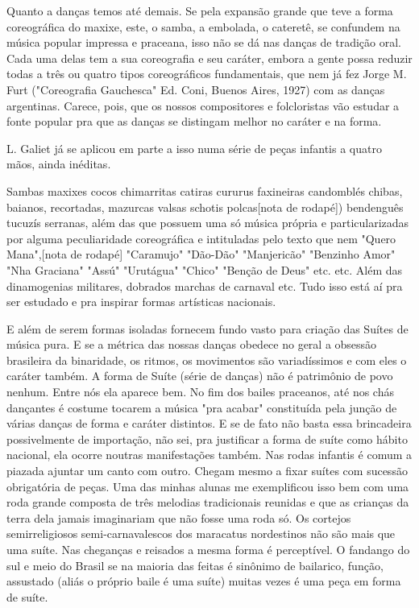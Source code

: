 Quanto a danças temos até demais. Se pela expansão grande que teve a
forma coreográfica do maxixe, este, o samba, a embolada, o cateretê, se
confundem na música popular impressa e praceana, isso não se dá nas
danças de tradição oral. Cada uma delas tem a sua coreografia e seu
caráter, embora a gente possa reduzir todas a três ou quatro tipos
coreográficos fundamentais, que nem já fez Jorge M. Furt ("Coreografia
Gauchesca" Ed. Coni, Buenos Aires, 1927) com as danças argentinas.
Carece, pois, que os nossos compositores e folcloristas vão estudar a
fonte popular pra que as danças se distingam melhor no caráter e na
forma.

L. Galiet já se aplicou em parte a isso numa série de peças infantis a
quatro mãos, ainda inéditas.

Sambas maxixes cocos chimarritas catiras cururus faxineiras candomblés
chibas, baianos, recortadas, mazurcas valsas schotis polcas{[}nota de
rodapé{]}) bendenguês tucuzís serranas, além das que possuem uma só
música própria e particularizadas por alguma peculiaridade coreográfica
e intituladas pelo texto que nem "Quero Mana",{[}nota de rodapé{]}
"Caramujo" "Dão-Dão" "Manjericão" "Benzinho Amor" "Nha Graciana" "Assú"
"Urutágua" "Chico" "Benção de Deus" etc. etc. Além das dinamogenias
militares, dobrados marchas de carnaval etc. Tudo isso está aí pra ser
estudado e pra inspirar formas artísticas nacionais.~

E além de serem formas isoladas fornecem fundo vasto para criação das
Suítes de música pura. E se a métrica das nossas danças obedece no geral
a obsessão brasileira da binaridade, os ritmos, os movimentos são
variadíssimos e com eles o caráter também. A forma de Suíte (série de
danças) não é patrimônio de povo nenhum. Entre nós ela aparece bem. No
fim dos bailes praceanos, até nos chás dançantes é costume tocarem a
música "pra acabar" constituída pela junção de várias danças de forma e
caráter distintos. E se de fato não basta essa brincadeira possivelmente
de importação, não sei, pra justificar a forma de suíte como hábito
nacional, ela ocorre noutras manifestações também. Nas rodas infantis é
comum a piazada ajuntar um canto com outro. Chegam mesmo a fixar suítes
com sucessão obrigatória de peças. Uma das minhas alunas me exemplificou
isso bem com uma roda grande composta de três melodias tradicionais
reunidas e que as crianças da terra dela jamais imaginariam que não
fosse uma roda só. Os cortejos semirreligiosos semi-carnavalescos dos
maracatus nordestinos não são mais que uma suíte. Nas cheganças e
reisados a mesma forma é perceptível. O fandango do sul e meio do Brasil
se na maioria das feitas é sinônimo de bailarico, função, assustado
(aliás o próprio baile é uma suíte) muitas vezes é uma peça em forma de
suíte.


